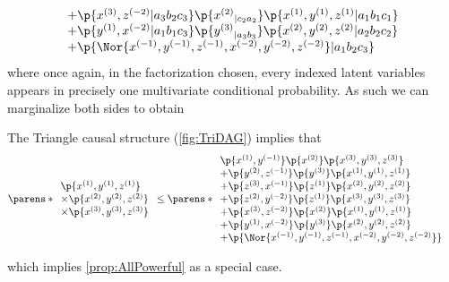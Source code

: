 \begin{widetext}
\begin{align}
{\begin{array}{l}
\\ +\p{ {x^{(3)}} , {z^{(-2)}} | a_3 b_2 c_3 }\p{{x^{(2)}}_{| c_2 a_2} }\p{ {x^{(1)}} , {y^{(1)}} , {z^{(1)}} | a_1 b_1 c_1 }
\\ +\p{ {y^{(1)}} , {x^{(-2)}} | a_1 b_1 c_3 }\p{{y^{(3)}}_{| a_3 b_3} }\p{ {x^{(2)}} , {y^{(2)}} , {z^{(2)}} | a_2 b_2 c_2 }
\\ + \p{ \Nor{ {x^{(-1)}} , {y^{(-1)}} , {z^{(-1)}} , {x^{(-2)}} , {y^{(-2)}} , {z^{(-2)}} } | a_1 b_2 c_3}
\end{array}}
\end{align}
where once again, in the factorization chosen, every indexed latent variables appears in precisely one multivariate conditional probability. As such we can marginalize both sides to obtain
\begin{prop} \label{prop:AllPowerful2}
The Triangle causal structure (\cref{fig:TriDAG}) implies that
\begin{align*}
&\parens*{\begin{array}{l}
  \p{ {x^{(1)}} , {y^{(1)}} , {z^{(1)}} }
   \\\times\p{ {x^{(2)}} , {y^{(2)}} , {z^{(2)}} }
   \\\times\p{ {x^{(3)}} , {y^{(3)}} , {z^{(3)}} }
\end{array}}
         \leq
 \parens*{\begin{array}{l}
    \p{ {x^{(1)}} , {y^{(-1)}} }\p{{x^{(2)}} }\p{ {x^{(3)}} , {y^{(3)}} , {z^{(3)}} }
\\ +\p{ {y^{(2)}} , {z^{(-1)}} }\p{{y^{(3)}} }\p{ {x^{(1)}} , {y^{(1)}} , {z^{(1)}} }
\\ +\p{ {z^{(3)}} , {x^{(-1)}} }\p{{z^{(1)}} }\p{ {x^{(2)}} , {y^{(2)}} , {z^{(2)}} }
\\ +\p{ {z^{(2)}} , {y^{(-2)}} }\p{{z^{(1)}} }\p{ {x^{(3)}} , {y^{(3)}} , {z^{(3)}} }
\\ +\p{ {x^{(3)}} , {z^{(-2)}} }\p{{x^{(2)}} }\p{ {x^{(1)}} , {y^{(1)}} , {z^{(1)}} }
\\ +\p{ {y^{(1)}} , {x^{(-2)}} }\p{{y^{(3)}} }\p{ {x^{(2)}} , {y^{(2)}} , {z^{(2)}} }
\\ + \p{ \Nor{ {x^{(-1)}} , {y^{(-1)}} , {z^{(-1)}} , {x^{(-2)}} , {y^{(-2)}} , {z^{(-2)}} } }
\end{array}}
\end{align*}
\end{prop} 
which implies \cref{prop:AllPowerful} as a special case. 


\end{widetext}